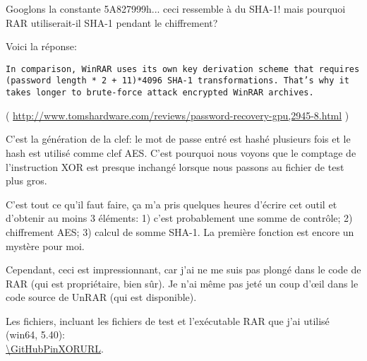 Googlons la constante 5A827999h... ceci ressemble à du SHA-1! mais pourquoi RAR utiliserait-il
SHA-1 pendant le chiffrement?

Voici la réponse:

\begin{lstlisting}
In comparison, WinRAR uses its own key derivation scheme that requires (password length * 2 + 11)*4096 SHA-1 transformations. That’s why it takes longer to brute-force attack encrypted WinRAR archives.
\end{lstlisting}
( \url{http://www.tomshardware.com/reviews/password-recovery-gpu,2945-8.html} )

C'est la génération de la clef: le mot de passe entré est hashé plusieurs fois et
le hash est utilisé comme clef \ac{AES}.
C'est pourquoi nous voyons que le comptage de l'instruction XOR est presque inchangé
lorsque nous passons au fichier de test plus gros.

C'est tout ce qu'il faut faire, ça m'a pris quelques heures d'écrire cet outil et
d'obtenir au moins 3 éléments: 1) c'est probablement une somme de contrôle; 2) chiffrement
\ac{AES}; 3) calcul de somme SHA-1.
La première fonction est encore un mystère pour moi.

Cependant, ceci est impressionnant, car j'ai ne me suis pas plongé dans le code de
RAR (qui est propriétaire, bien sûr). Je n'ai même pas jeté un coup d'\oe{}il dans
le code source de UnRAR (qui est disponible).

Les fichiers, incluant les fichiers de test et l'exécutable RAR que j'ai utilisé (win64, 5.40): \\
\url{\GitHubPinXORURL}.


